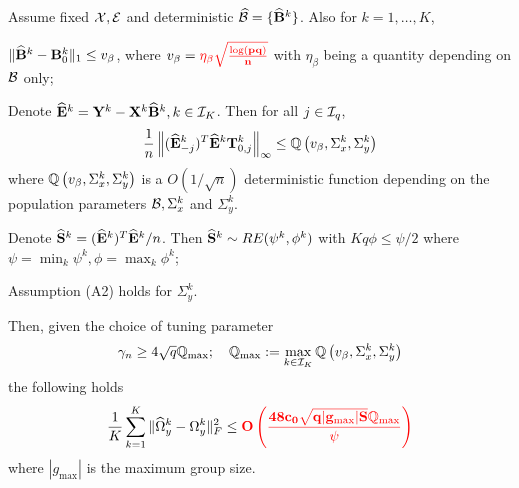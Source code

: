 \documentclass[12pt, letterpaper]{article}
\theoremstyle{definition}
\numberwithin{equation}{section}
\begin{document}
\begin{Theorem}\label{thm:ThetaThm}
Assume fixed ${\cal{X}}, {\cal{E}}$ and deterministic $\widehat {{\cal{B}}} = \{ \widehat {{\mathbf{B}}}^k \}$. Also for $k = 1, \ldots, K$,

 $\| \widehat {{\mathbf{B}}}^k - {\mathbf{B}}^k_0 \|_1 \leq v_\beta$, where $v_\beta = { \color{red} \bf \eta_\beta \sqrt{\frac{\log (pq)}{n}}}$ with $\eta_\beta$ being a quantity depending on ${\cal{B}}$ only;


 Denote \textbf{$\widehat {{\mathbf{E}}}^k = {\mathbf{Y}}^k - {\mathbf{X}}^k \widehat {{\mathbf{B}}}^k, k \in {\cal{I}}_K$}. Then for all $j \in {\cal{I}}_q$,
%
$$
\frac{1}{n} \left\| (\widehat {{\mathbf{E}}}_{-j}^k)^T \widehat {{\mathbf{E}}}^k {\mathbf{T}}_{0,j}^k \right\|_\infty \leq
{\mathbb{Q}} \left(v_\beta, \Sigma_x^k, \Sigma_y^k \right)
$$
%
where ${\mathbb{Q}} \left(v_\beta, \Sigma_x^k, \Sigma_y^k \right)$ is a $O(1/\sqrt n)$ deterministic function depending on the population parameters ${\cal{B}}, \Sigma_x^k$ and $\Sigma_y^k$.

 Denote $\widehat {{\mathbf{S}}}^k = (\widehat {{\mathbf{E}}}^k)^T \widehat {{\mathbf{E}}}^k/n$. Then $\widehat {{\mathbf{S}}}^k \sim RE(\psi^k, \phi^k)$ with $Kq \phi \leq \psi/2$ where $ \psi = \min_k \psi^k, \phi = \max_k \phi^k $;

 Assumption (A2) holds for $\Sigma_y^k$.

Then, given the choice of tuning parameter
%
$$
\gamma_n \geq 4 \sqrt q {\mathbb{Q}}_{\max}; \quad {\mathbb{Q}}_{\max} := \max_{k \in {\cal{I}}_K} {\mathbb{Q}} \left(v_\beta, \Sigma_x^k, \Sigma_y^k \right)
$$
%
the following holds
%
\begin{align}
\frac{1}{K} \sum_{k=1}^K \| \widehat \Omega_y^k - \Omega_y^k \|_F^2 \leq
{\color{red} \bf O \left( \frac{48 c_0 \sqrt{ q |g_{\max}| S} {\mathbb{Q}}_{\max}} {\psi}
\right)}
\end{align}
%
where $|g_{\max}|$ is the maximum group size.

%
\end{Theorem}
\end{document}
